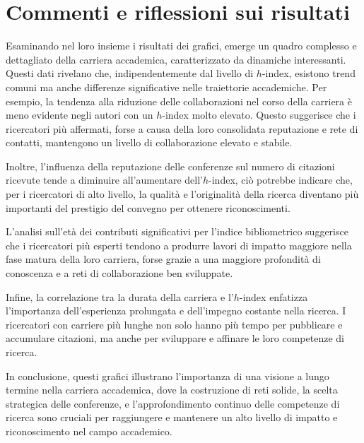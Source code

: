 \section{Commenti e riflessioni sui risultati}
Esaminando nel loro insieme i risultati dei grafici, emerge un quadro complesso e dettagliato della carriera accademica, caratterizzato da dinamiche interessanti.
Questi dati rivelano che, indipendentemente dal livello di $h$-index, esistono trend comuni ma anche differenze significative nelle traiettorie accademiche. Per esempio, la tendenza alla riduzione delle collaborazioni nel corso della carriera è meno evidente negli autori con un $h$-index molto elevato. Questo suggerisce che i ricercatori più affermati, forse a causa della loro consolidata reputazione e rete di contatti, mantengono un livello di collaborazione elevato e stabile.

Inoltre, l'influenza della reputazione delle conferenze sul numero di citazioni ricevute tende a diminuire all'aumentare dell'$h$-index, ciò potrebbe indicare che, per i ricercatori di alto livello, la qualità e l'originalità della ricerca diventano più importanti del prestigio del convegno per ottenere riconoscimenti.

L'analisi sull'età dei contributi significativi per l'indice bibliometrico suggerisce che i ricercatori più esperti tendono a produrre lavori di impatto maggiore nella fase matura della loro carriera, forse grazie a una maggiore profondità di conoscenza e a reti di collaborazione ben sviluppate.

Infine, la correlazione tra la durata della carriera e l'$h$-index enfatizza l'importanza dell'esperienza prolungata e dell'impegno costante nella ricerca. I ricercatori con carriere più lunghe non solo hanno più tempo per pubblicare e accumulare citazioni, ma anche per sviluppare e affinare le loro competenze di ricerca.

In conclusione, questi grafici illustrano l'importanza di una visione a lungo termine nella carriera accademica, dove la costruzione di reti solide, la scelta strategica delle conferenze, e l'approfondimento continuo delle competenze di ricerca sono cruciali per raggiungere e mantenere un alto livello di impatto e riconoscimento nel campo accademico.